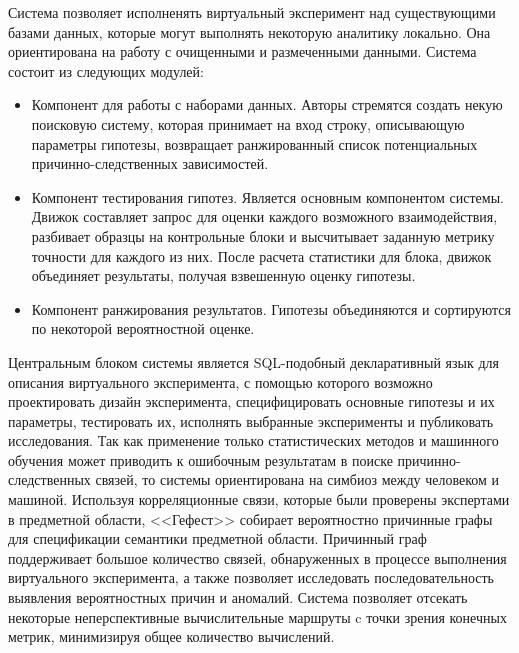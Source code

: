 Система позволяет исполненять виртуальный эксперимент над существующими базами данных, которые могут выполнять 
некоторую аналитику локально. Она ориентирована на работу с очищенными и размеченными данными. Система состоит из 
следующих модулей:
\begin{itemize}
    \item Компонент для работы с наборами данных. Авторы стремятся создать некую поисковую систему, которая принимает 
            на вход строку, описывающую параметры гипотезы, возвращает ранжированный список потенциальных 
            причинно-следственных зависимостей.
    \item Компонент тестирования гипотез. Является основным компонентом системы. Движок составляет запрос для оценки 
            каждого возможного взаимодействия, разбивает образцы на контрольные блоки и высчитывает заданную метрику 
            точности для каждого из них. После расчета статистики для блока, движок объединяет результаты, получая 
            взвешенную оценку гипотезы.
    \item Компонент ранжирования результатов. Гипотезы объединяются и сортируются по некоторой вероятностной оценке.
\end{itemize}

Центральным блоком системы является SQL-подобный декларативный язык для описания виртуального эксперимента, 
с помощью которого возможно проектировать дизайн эксперимента, специфицировать основные гипотезы и их параметры, 
тестировать их, исполнять выбранные эксперименты и публиковать исследования. Так как применение только статистических 
методов и машинного обучения может приводить к ошибочным результатам в поиске причинно-следственных связей, то системы 
ориентирована на симбиоз между человеком и машиной. Используя корреляционные связи, которые были проверены экспертами 
в предметной области, <<Гефест>> собирает вероятностно причинные графы для спецификации семантики предметной области. 
Причинный граф поддерживает большое количество связей, обнаруженных в процессе выполнения виртуального эксперимента, 
а также позволяет исследовать последовательность выявления вероятностных причин и аномалий. Система позволяет отсекать 
некоторые неперспективные вычислительные маршруты c точки зрения конечных метрик, 
минимизируя общее количество вычислений.


